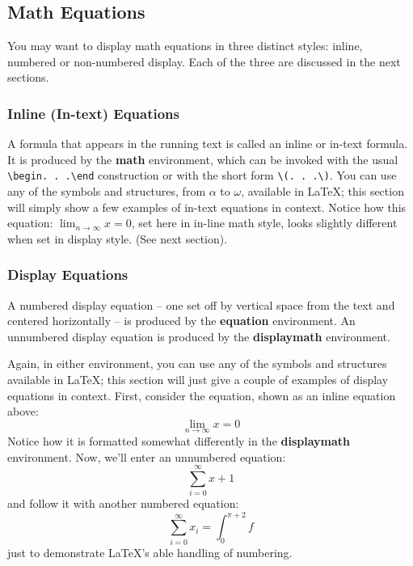 \documentclass{acm_proc_article-sp}
\begin{document}
\subsection{Math Equations}
\label{sec-3-2}

You may want to display math equations in three distinct styles:
inline, numbered or non-numbered display.  Each of
the three are discussed in the next sections.
\subsubsection{Inline (In-text) Equations}
\label{sec-3-2-1}

A formula that appears in the running text is called an inline or
in-text formula.  It is produced by the \textbf{math} environment, which can
be invoked with the usual \texttt{\textbackslash{}begin. . .\textbackslash{}end} construction or with the
short form \texttt{\textbackslash{}(. . .\textbackslash{})}. You can use any of the symbols and structures,
from $\alpha$ to $\omega$, available in \LaTeX{}\cite{Lamport:LaTeX}; this
section will simply show a few examples of in-text equations in
context. Notice how this equation: \( \lim_{n\rightarrow \infty}x=0
\), set here in in-line math style, looks slightly different when set
in display style.  (See next section).
\subsubsection{Display Equations}
\label{sec-3-2-2}

A numbered display equation -- one set off by vertical space
from the text and centered horizontally -- is produced
by the \textbf{equation} environment. An unnumbered display
equation is produced by the \textbf{displaymath} environment.

Again, in either environment, you can use any of the symbols
and structures available in \LaTeX{}; this section will just
give a couple of examples of display equations in context.
First, consider the equation, shown as an inline equation above:
\begin{equation}\lim_{n\rightarrow \infty}x=0\end{equation}
Notice how it is formatted somewhat differently in
the \textbf{displaymath}
environment.  Now, we'll enter an unnumbered equation:
\begin{displaymath}
\sum_{i=0}^{\infty} x + 1
\end{displaymath}
and follow it with another numbered equation:
\begin{equation}
\sum_{i=0}^{\infty}x_i=\int_{0}^{\pi+2} f
\end{equation}
just to demonstrate \LaTeX's able handling of numbering.
\end{document}

